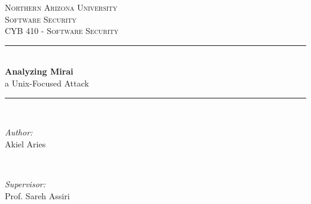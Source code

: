 \documentclass[12pt, letterpaper]{article}
\begin{document}
\newcommand{\paperauthor}{Akiel Aries}
\newcommand{\papersupervisor}{Prof. Sareh Assiri}
\newcommand{\paperuniversity}{Northern Arizona University}

\newcommand{\papertitle}{Analyzing Mirai}
\newcommand{\paperminortitle}{a Unix-Focused Attack}
\newcommand{\papermajorheading}{Software Security}
\newcommand{\paperminorheading}{CYB 410 - Software Security}

\newcommand{\HRule}{\rule{\linewidth}{0.5mm}} %

\center %


\textsc{\LARGE \paperuniversity}\\[1.0cm] %
\textsc{\Large \papermajorheading}\\[0.2cm] %
\textsc{\large \paperminorheading}\\[0.75cm] %


\HRule \\[0.4cm]
{ \huge \bfseries \papertitle}\\[0.05cm] %
{ \huge \paperminortitle}\\[0.025cm] %
\HRule \\[3.5cm]

\vfill %


\begin{minipage}{0.4\textwidth}
	\begin{flushleft} \large
	\emph{Author:}\\
	\paperauthor
	\end{flushleft}
	\end{minipage}
	~
	\begin{minipage}{0.4\textwidth}
	\begin{flushright} \large
	\emph{Supervisor:} \\
	\papersupervisor
	\end{flushright}
\end{minipage}\\[1cm]
\end{document}
